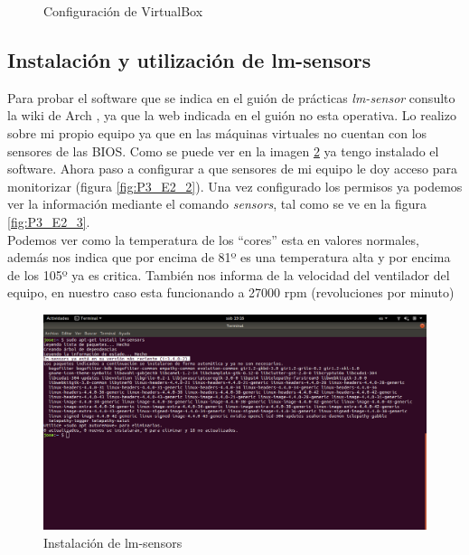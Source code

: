 \begin{figure}[H] %
\centering
\caption{Configuración de VirtualBox} \label{fig:P3_T1_1}
\end{figure}

\subsection{Instalación y utilización de lm-sensors}
Para probar el software que se indica en el guión de prácticas \textit{lm-sensor} consulto 
la wiki de Arch \cite{lmSensor}, ya que la web indicada en el guión no esta operativa.
Lo realizo sobre mi propio equipo ya que en las máquinas virtuales no cuentan con los sensores de
las BIOS.
Como se puede ver en la imagen \ref{fig:P3_E2_1} ya tengo instalado el software. Ahora paso a 
configurar a que sensores de mi equipo le doy acceso para monitorizar (figura \ref{fig:P3_E2_2}).
Una vez configurado los permisos ya podemos ver la información mediante el comando \textit{sensors},
tal como se ve en la figura \ref{fig:P3_E2_3}.\\

Podemos ver como la temperatura de los ``cores'' esta en valores normales, además nos indica que por
encima de 81º es una temperatura alta y por encima de los 105º ya es critica. También nos informa de la
velocidad del ventilador del equipo, en nuestro caso esta funcionando a 27000 rpm (revoluciones por minuto)

\begin{figure}[H] %
\centering
\includegraphics[scale=0.3]{./imagenes/P3_E2_1.png}  %
\caption{Instalación de lm-sensors} \label{fig:P3_E2_1}
\end{figure}

